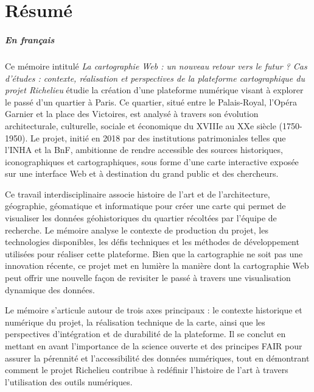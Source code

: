 \documentclass[openany, a4paper, 12pt, twoside]{book}
\begin{document}
\thispagestyle{empty}	
\cleardoublepage
	
\frontmatter
\chapter{Résumé}

\medskip
\paragraph{En français}
\medskip
Ce mémoire intitulé \textit{La cartographie Web : un nouveau retour vers le futur ? Cas d'études : contexte, réalisation et perspectives de la plateforme cartographique du projet Richelieu} étudie la création d'une plateforme numérique visant à explorer le passé d'un quartier à Paris. Ce quartier, situé entre le Palais-Royal, l'Opéra Garnier et la place des Victoires, est analysé à travers son évolution architecturale, culturelle, sociale et économique du XVIIIe au XXe siècle (1750-1950). Le projet, initié en 2018 par des institutions patrimoniales telles que l'INHA et la BnF, ambitionne de rendre accessible des sources historiques, iconographiques et cartographiques, sous forme d'une carte interactive exposée sur une interface Web et à destination du grand public et des chercheurs.

Ce travail interdisciplinaire associe histoire de l'art et de l'architecture, géographie, géomatique et informatique pour créer une carte qui permet de visualiser les données géohistoriques du quartier récoltées par l'équipe de recherche. Le mémoire analyse le contexte de production du projet, les technologies disponibles, les défis techniques et les méthodes de développement utilisées pour réaliser cette plateforme. Bien que la cartographie ne soit pas une innovation récente, ce projet met en lumière la manière dont la cartographie Web peut offrir une nouvelle façon de revisiter le passé à travers une visualisation dynamique des données.

Le mémoire s'articule autour de trois axes principaux : le contexte historique et numérique du projet, la réalisation technique de la carte, ainsi que les perspectives d'intégration et de durabilité de la plateforme. Il se conclut en mettant en avant l'importance de la science ouverte et des principes FAIR pour assurer la pérennité et l'accessibilité des données numériques, tout en démontrant comment le projet Richelieu contribue à redéfinir l'histoire de l'art à travers l'utilisation des outils numériques. 
\newpage
\end{document}
